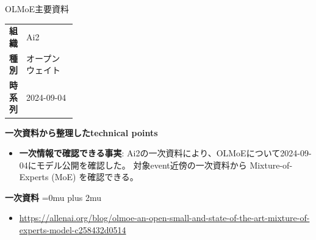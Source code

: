 \begin{technicalnote}{OLMoE}{主要資料}
\begingroup
\begin{tabularx}{\linewidth}{@{}>{\bfseries}p{0.22\linewidth}X@{}}
組織 & Ai2 \\
種別 & オープンウェイト \\
時系列 & 2024-09-04 \\
\end{tabularx}
\smallskip
{\bfseries 一次資料から整理したtechnical points}
\begin{itemize}[leftmargin=1.5em,itemsep=0.35em]
\item \textbf{一次情報で確認できる事実}: Ai2の一次資料により、OLMoEについて2024-09-04にモデル公開を確認した。 対象event近傍の一次資料から Mixture-of-Experts (MoE) を確認できる。
\end{itemize}
\begin{minipage}{\linewidth}
\begin{samepage}
{\bfseries 一次資料}
\begingroup\sloppy
\Urlmuskip=0mu plus 2mu\relax
\begin{itemize}[leftmargin=1.5em,itemsep=0.25em]
\item {\scriptsize\url{https://allenai.org/blog/olmoe-an-open-small-and-state-of-the-art-mixture-of-experts-model-c258432d0514}}
\end{itemize}
\endgroup
\end{samepage}
\end{minipage}
\endgroup
\end{technicalnote}
\medskip


